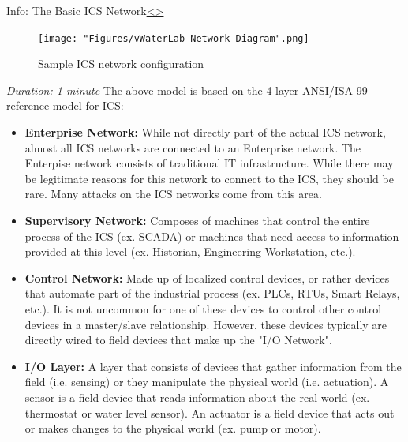 \documentclass[12pt]{extarticle}
\newcommand{\bi}{\begin{itemize}}
\newcommand{\ei}{\end{itemize}}
\newcounter{next}
\newcounter{prev}
\begin{document}

\pagebreak
{}
\begin{slide}{Info: The Basic ICS Network}{\hyperref[slide \theprev]{\textless}\hyperref[slide \thenext]{\textgreater}}
	\vspace{-.75cm}
	\begin{figure}[H]
		\centering
		\texttt{[image: "Figures/vWaterLab-Network Diagram".png]}
		\caption{Sample ICS network configuration}
	\end{figure}
\end{slide}
\textit{Duration: 1 minute}
\vfill
\noindent
The above model is based on the 4-layer  ANSI/ISA-99 reference model for ICS:
\bi
	\item \textbf{Enterprise Network:} While not directly part of the actual ICS network, almost all ICS networks are connected to an Enterprise network. The Enterpise network consists of traditional IT infrastructure. While there may be legitimate reasons for this network to connect to the ICS, they should be rare. Many attacks on the ICS networks come from this area.
	\item \textbf{Supervisory Network:} Composes of machines that control the entire process of the ICS (ex. SCADA) or machines that need access to information provided at this level (ex. Historian, Engineering Workstation, etc.).
	\item \textbf{Control Network:} Made up of localized control devices, or rather devices that automate part of the industrial process (ex. PLCs, RTUs, Smart Relays, etc.). It is not uncommon for one of these devices to control other control devices in a master/slave relationship. However, these devices typically are directly wired to field devices that make up the "I/O Network".
	\item \textbf{I/O Layer:} A layer that consists of devices that gather information from the field (i.e. sensing) or they manipulate the physical world (i.e. actuation). A sensor is a field device that reads information about the real world (ex. thermostat or water level sensor). An actuator is a field device that acts out or makes changes to the physical world (ex. pump or motor).
\ei
\pagebreak

\end{document}
